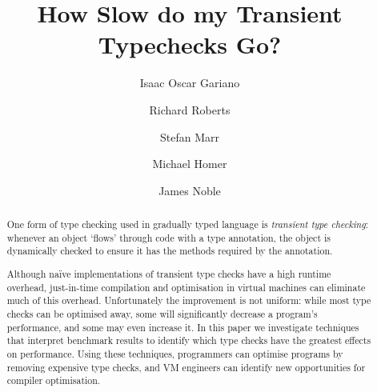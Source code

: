 \documentclass[sigplan,10pt,review,screen]{acmart}\settopmatter{printfolios=true}
\begin{document}
\title{How Slow do my Transient Typechecks Go?}

\author{Isaac Oscar Gariano}

\author{Richard Roberts}


\author{Stefan Marr}


\author{Michael Homer}



\author{James Noble}




\begin{abstract}
One form of type checking used in gradually typed language is
\emph{transient type checking}: whenever an object `flows' through
code with a type annotation, the object is dynamically checked to
ensure it has the methods required by the annotation.

Although na\"ive implementations of transient type checks have a high runtime overhead, just-in-time compilation and optimisation in virtual machines can eliminate much of this overhead.  Unfortunately
the improvement is not uniform: while most type checks can be optimised
away, some will significantly decrease a program's
performance, and some may even increase it.  In this paper we investigate techniques that interpret benchmark results to identify which type checks have the greatest effects on performance.
Using these techniques,
programmers can optimise programs by removing expensive type checks,
and VM engineers can identify new opportunities for compiler optimisation.   

\end{abstract}
\end{document}
